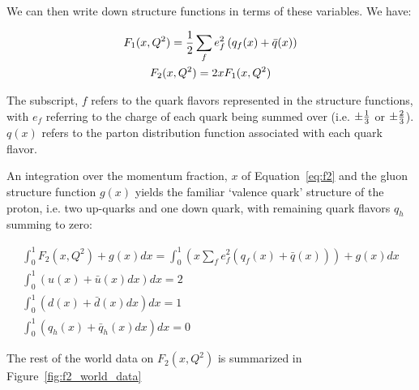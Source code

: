 We can then write down structure functions in terms of these variables. We have:

\begin{gather}
  F_1(x,Q^2) = {1 \over 2}\sum_f e_f^2 \left(q_f(x)+\bar{q}(x)\right)
  \label{eq:f1} \\
  F_2(x,Q^2) = 2xF_1(x,Q^2)\label{eq:f2}
\end{gather}

The subscript, $f$ refers to the quark flavors represented in the structure
functions, with $e_f$ referring to the charge of each quark being summed over
(i.e. ${\pm}{1\over3}$ or ${\pm}{2\over3}$). $q(x)$ refers to the parton
distribution function associated with each quark flavor. 

An integration over the momentum fraction, $x$ of Equation~\ref{eq:f2} and the
gluon structure function $g(x)$ yields the familiar `valence quark' structure of
the proton, i.e. two up-quarks and one down quark, with remaining quark flavors
$q_h$ summing to zero:

\begin{gather}
	\int_0^1 F_2(x,Q^2) + g(x) dx 
	= \int_0^1 
	\left(
		x\sum_f e_f^2 \left(q_f(x)+\bar{q}(x)\right) 
	\right) 
	+ g(x) dx \label{eq:f2_int_1} \\
	\int_0^1 \left(u(x)+\bar{u}(x) dx \right) dx = 2  \label{eq:up_quark_valence} \\
	\int_0^1 \left(d(x)+\bar{d}(x) dx \right) dx = 1  \label{eq:down_quark_valence} \\
	\int_0^1 \left(q_h(x)+\bar{q}_h(x) dx \right) dx = 0 \label{eq:other_quark_valence}
\end{gather}

The rest of the world data on $F_2(x,Q^2)$ is summarized in
Figure~\ref{fig:f2_world_data}

